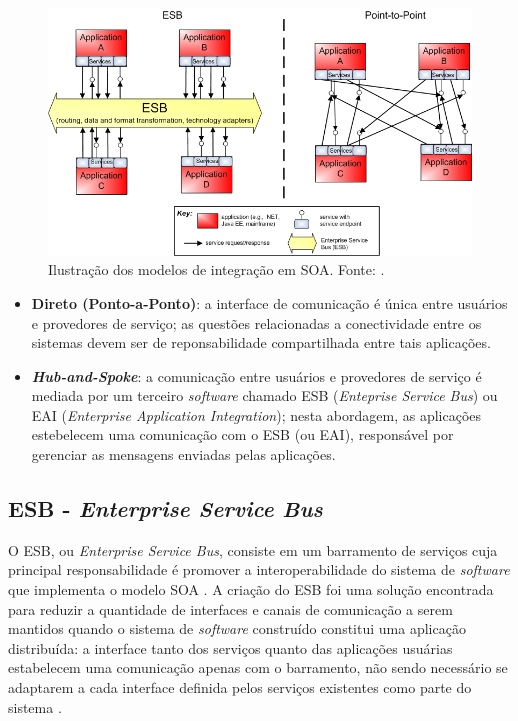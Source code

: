 \begin{figure}[htb]
\centering
\includegraphics[scale=0.7]{figuras/modelos_integracao_soa.png}
\caption{Ilustração dos modelos de integração em SOA. Fonte: \cite{Bianco2007}.}
\label{modelos_integracao_soa}
\end{figure}

\begin{itemize}
\item \textbf{Direto (Ponto-a-Ponto)}: a interface de comunicação é única entre usuários e provedores de serviço; as questões relacionadas a conectividade entre os sistemas devem ser de reponsabilidade compartilhada entre tais aplicações.
\item \textbf{\textit{Hub-and-Spoke}}: a comunicação entre usuários e provedores de serviço é mediada por um terceiro \textit{software} chamado ESB (\textit{Enteprise Service Bus}) ou EAI (\textit{Enterprise Application Integration}); nesta abordagem, as aplicações estebelecem uma comunicação com o ESB (ou EAI), responsável por gerenciar as mensagens enviadas pelas aplicações.
\end{itemize}

\subsection{ESB - \textit{Enterprise Service Bus}}

O ESB, ou \textit{Enterprise Service Bus}, consiste em um barramento de serviços cuja principal responsabilidade é promover a interoperabilidade do sistema de \textit{software} que implementa o modelo SOA \cite{josuttis_soa_2007}. A criação do ESB foi uma solução encontrada para reduzir a quantidade de interfaces e canais de comunicação a serem mantidos quando o sistema de \textit{software} construído constitui uma aplicação distribuída: a interface tanto dos serviços quanto das aplicações usuárias estabelecem uma comunicação apenas com o barramento, não sendo necessário se adaptarem a cada interface definida pelos serviços existentes como parte do sistema \cite{josuttis_soa_2007}.

